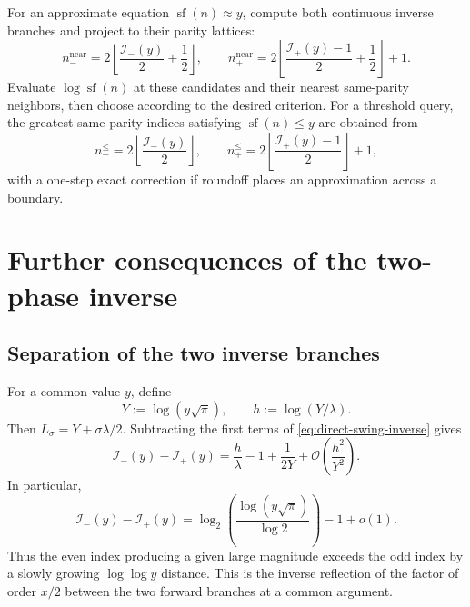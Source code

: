 \documentclass[11pt,a4paper]{article}
\numberwithin{equation}{section}
\theoremstyle{definition}
\theoremstyle{remark}
\newcommand{\Ord}{\mathcal O}
\newcommand{\SF}{\operatorname{sf}}
\begin{document}
For an approximate equation \(\SF(n)\approx y\), compute both continuous
inverse branches and project to their parity lattices:
\begin{equation}\label{eq:nearest-parity}
 n_-^{\mathrm{near}}=2\left\lfloor\frac{\mathcal I_-(y)}2+\frac12\right\rfloor,
 \qquad
 n_+^{\mathrm{near}}=2\left\lfloor
       \frac{\mathcal I_+(y)-1}{2}+\frac12\right\rfloor+1.
\end{equation}
Evaluate \(\log\SF(n)\) at these candidates and their nearest same-parity
neighbors, then choose according to the desired criterion.  For a threshold
query, the greatest same-parity indices satisfying \(\SF(n)\le y\) are
obtained from
\begin{equation}\label{eq:floor-parity}
 n_-^{\le}=2\left\lfloor\frac{\mathcal I_-(y)}2\right\rfloor,
 \qquad
 n_+^{\le}=2\left\lfloor\frac{\mathcal I_+(y)-1}{2}\right\rfloor+1,
\end{equation}
with a one-step exact correction if roundoff places an approximation across
a boundary.

\section{Further consequences of the two-phase inverse}

\subsection{Separation of the two inverse branches}

For a common value \(y\), define
\begin{equation}\label{eq:Y-h-common}
 Y:=\log(y\sqrt\pi),\qquad h:=\log(Y/\lambda).
\end{equation}
Then \(L_\sigma=Y+\sigma\lambda/2\).  Subtracting the first terms of
\cref{eq:direct-swing-inverse} gives
\begin{equation}\label{eq:branch-gap}
 \boxed{\quad
 \mathcal I_-(y)-\mathcal I_+(y)
 =\frac{h}{\lambda}-1+\frac1{2Y}
 +\Ord\!\left(\frac{h^2}{Y^2}\right).
 \quad}
\end{equation}
In particular,
\begin{equation}\label{eq:branch-gap-leading}
 \mathcal I_-(y)-\mathcal I_+(y)
 =\log_2\!\left(\frac{\log(y\sqrt\pi)}{\log2}\right)-1+o(1).
\end{equation}
Thus the even index producing a given large magnitude exceeds the odd index
by a slowly growing \(\log\log y\) distance.  This is the inverse reflection
of the factor of order \(x/2\) between the two forward branches at a common
argument.
\end{document}
